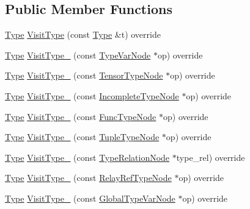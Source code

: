 \subsection*{Public Member Functions}
\begin{DoxyCompactItemize}
\item 
\hyperlink{classtvm_1_1Type}{Type} \hyperlink{classtvm_1_1TypeMutator_a84e824911927d98e20a338eab8b75a45}{Visit\+Type} (const \hyperlink{classtvm_1_1Type}{Type} \&t) override
\item 
\hyperlink{classtvm_1_1Type}{Type} \hyperlink{classtvm_1_1TypeMutator_a76915eced75e531e0ca73ad6882bbaae}{Visit\+Type\+\_\+} (const \hyperlink{classtvm_1_1TypeVarNode}{Type\+Var\+Node} $\ast$op) override
\item 
\hyperlink{classtvm_1_1Type}{Type} \hyperlink{classtvm_1_1TypeMutator_a4c7667d35d0a9a28c957165b65536c93}{Visit\+Type\+\_\+} (const \hyperlink{classtvm_1_1TensorTypeNode}{Tensor\+Type\+Node} $\ast$op) override
\item 
\hyperlink{classtvm_1_1Type}{Type} \hyperlink{classtvm_1_1TypeMutator_a2a78bda75555650a37a80e1e074d562a}{Visit\+Type\+\_\+} (const \hyperlink{classtvm_1_1IncompleteTypeNode}{Incomplete\+Type\+Node} $\ast$op) override
\item 
\hyperlink{classtvm_1_1Type}{Type} \hyperlink{classtvm_1_1TypeMutator_a11e7e2f91d7dd05bee32aee6260eb459}{Visit\+Type\+\_\+} (const \hyperlink{classtvm_1_1FuncTypeNode}{Func\+Type\+Node} $\ast$op) override
\item 
\hyperlink{classtvm_1_1Type}{Type} \hyperlink{classtvm_1_1TypeMutator_ac694fbe28eb7026d30c5ca5fa2fb4a1a}{Visit\+Type\+\_\+} (const \hyperlink{classtvm_1_1TupleTypeNode}{Tuple\+Type\+Node} $\ast$op) override
\item 
\hyperlink{classtvm_1_1Type}{Type} \hyperlink{classtvm_1_1TypeMutator_a18a04668d3fb464d957f3a26a4274104}{Visit\+Type\+\_\+} (const \hyperlink{classtvm_1_1TypeRelationNode}{Type\+Relation\+Node} $\ast$type\+\_\+rel) override
\item 
\hyperlink{classtvm_1_1Type}{Type} \hyperlink{classtvm_1_1TypeMutator_a89bd7a76f5a736defc7f3b0dda664761}{Visit\+Type\+\_\+} (const \hyperlink{classtvm_1_1RelayRefTypeNode}{Relay\+Ref\+Type\+Node} $\ast$op) override
\item 
\hyperlink{classtvm_1_1Type}{Type} \hyperlink{classtvm_1_1TypeMutator_ad4ad7209f8789568e5e57870f0b758f0}{Visit\+Type\+\_\+} (const \hyperlink{classtvm_1_1GlobalTypeVarNode}{Global\+Type\+Var\+Node} $\ast$op) override
\item 

\end{DoxyCompactItemize}
